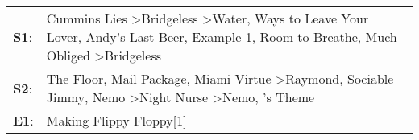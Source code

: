\begin{supertabular}{p{0.03\textwidth}p{0.92\textwidth}}
 \textbf{S1}:  &  Cummins Lies\textsuperscript{} \textgreater \enspace Bridgeless\textsuperscript{} \textgreater \enspace Water\textsuperscript{},  Ways to Leave Your Lover\textsuperscript{}, \enspace Andy's Last Beer\textsuperscript{}, \enspace Example 1\textsuperscript{}, \enspace Room to Breathe\textsuperscript{}, \enspace Much Obliged\textsuperscript{} \textgreater \enspace Bridgeless\textsuperscript{}  \enspace  \\
 \textbf{S2}:  &                                   The Floor\textsuperscript{}, \enspace Mail Package\textsuperscript{}, \enspace Miami Virtue\textsuperscript{} \textgreater \enspace Raymond\textsuperscript{}, \enspace Sociable Jimmy\textsuperscript{}, \enspace Nemo\textsuperscript{} \textgreater \enspace Night Nurse\textsuperscript{} \textgreater \enspace Nemo\textsuperscript{}, 's Theme\textsuperscript{}  \enspace  \\
 \textbf{E1}:  &                                                                                                                                                                                                                                                                                                                                                                           Making Flippy Floppy[1]\textsuperscript{}  \enspace  \\
\end{supertabular}
